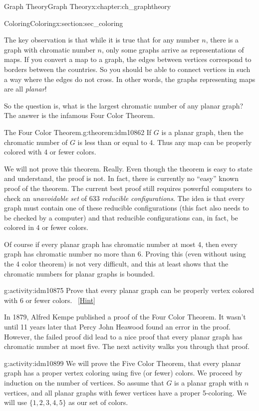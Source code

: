 \documentclass[oneside,10pt,]{book}
\numberwithin{equation}{chapter}
\begin{document}
\begin{chapterptx}{Graph Theory}{}{Graph Theory}{}{}{x:chapter:ch_graphtheory}
\begin{sectionptx}{Coloring}{}{Coloring}{}{}{x:section:sec_coloring}
\begin{introduction}{}
\par
The key observation is that while it is true that for any number \(n\), there is a graph with chromatic number \(n\), only some graphs arrive as representations of maps. If you convert a map to a graph, the edges between vertices correspond to borders between the countries. So you should be able to connect vertices in such a way where the edges do not cross. In other words, the graphs representing maps are all \emph{planar}!%
\par
So the question is, what is the largest chromatic number of any planar graph? The answer is the infamous Four Color Theorem.%
\begin{theorem}{The Four Color Theorem.}{}{g:theorem:idm10862}%
 If \(G\) is a planar graph, then the chromatic number of \(G\) is less than or equal to 4. Thus any map can be properly colored with 4 or fewer colors.%
\end{theorem}
We will not prove this theorem. Really. Even though the theorem is easy to state and understand, the proof is not. In fact, there is currently no ``easy'' known proof of the theorem. The current best proof still requires powerful computers to check an \emph{unavoidable set} of 633 \emph{reducible configurations}. The idea is that every graph must contain one of these reducible configurations (this fact also needs to be checked by a computer) and that reducible configurations can, in fact, be colored in 4 or fewer colors.%
\par
Of course if every planar graph has chromatic number at most 4, then every graph has chromatic number no more than 6.  Proving this (even without using the 4 color theorem) is not very difficult, and this at least shows that the chromatic numbers for planar graphs is bounded.%
\begin{activity}{}{g:activity:idm10875}%
Prove that every planar graph can be properly vertex colored with 6 or fewer colors.%
\qquad~\hfill{\tiny\hyperlink{g:hint:idm10878-back}{[Hint]}}\end{activity}
In 1879, Alfred Kempe published a proof of the Four Color Theorem.  It wasn't until 11 years later that Percy John Heawood found an error in the proof.  However, the failed proof did lead to a nice proof that every planar graph has chromatic number at most five.  The next activity walks you through that proof.%
\begin{activity}{}{g:activity:idm10899}%
We will prove the Five Color Theorem, that every planar graph has a proper vertex coloring using five (or fewer) colors.  We proceed by induction on the number of vertices.  So assume that \(G\) is a planar graph with \(n\) vertices, and all planar graphs with fewer vertices have a proper 5-coloring.  We will use \(\{1,2,3,4,5\}\) as our set of colors.%

\end{activity}
\end{introduction}
\end{sectionptx}
\end{chapterptx}
\end{document}
